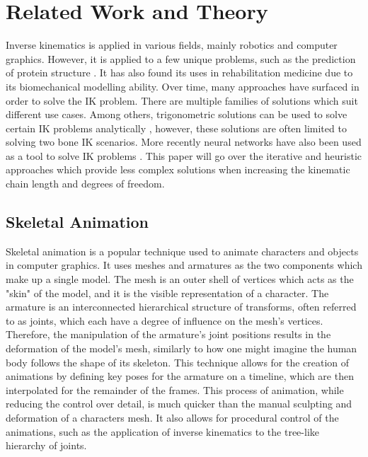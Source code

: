 \chapter{Related Work and Theory}
Inverse kinematics is applied in various fields, mainly robotics and computer
graphics. However, it is applied to a few unique problems, such as the
prediction of protein structure \cite{ccd_protein}. It has also found its uses
in rehabilitation medicine due to its biomechanical modelling ability. Over
time, many approaches have surfaced in order to solve the IK problem. There are
multiple families of solutions \cite{Aristidou2011} which suit different use
cases. Among others, trigonometric solutions can be used to solve certain IK
problems analytically \cite{raheem_trig}, however, these solutions are often
limited to solving two bone IK scenarios. More recently neural networks have
also been used as a tool to solve IK problems \cite{nn_IK}. This paper will go
over the iterative and heuristic approaches which provide less complex solutions
when increasing the kinematic chain length and degrees of freedom.

\section{Skeletal Animation}
Skeletal animation is a popular technique used to animate characters and objects
in computer graphics. It uses meshes and armatures as the two components
which make up a single model. The mesh is an outer shell of vertices which acts
as the "skin" of the model, and it is the visible representation of a character.
The armature is an interconnected hierarchical structure of transforms, often
referred to as joints, which each have a degree of influence on the mesh's
vertices. Therefore, the manipulation of the armature's joint positions
results in the deformation of the model's mesh, similarly to how one might
imagine the human body follows the shape of its skeleton. This technique allows
for the creation of animations by defining key poses for the armature on
a timeline, which are then interpolated for the remainder of the frames. This
process of animation, while reducing the control over detail, is much quicker
than the manual sculpting and deformation of a characters mesh. It also allows
for procedural control of the animations, such as the application of inverse
kinematics to the tree-like hierarchy of joints.

